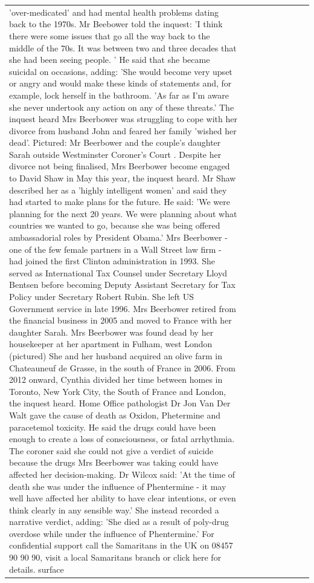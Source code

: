 \begin{table}[H]
\begin{tabular}{lllrlllll}
'over-medicated' and had mental health problems dating back to the 1970s. Mr Beebower told the inquest: 'I think there were some issues that go all the way back to the middle of the 70s. It was between two and three decades that she had been seeing people. ' He said that she became suicidal on occasions, adding: 'She would become very upset or angry and would make these kinds of statements and, for example, lock herself in the bathroom. 'As far as I'm aware she never undertook any action on any of these threats.' The inquest heard Mrs Beerbower was struggling to cope with her divorce from husband John and feared her family 'wished her dead'. Pictured: Mr Beerbower and the couple's daughter Sarah outside Westminster Coroner's Court . Despite her divorce not being finalised, Mrs Beerbower become engaged to David Shaw in May this year, the inquest heard. Mr Shaw described her as a 'highly intelligent women' and said they had started to make plans for the future. He said: 'We were planning for the next 20 years. We were planning about what countries we wanted to go, because she was being offered ambassadorial roles by President Obama.' Mrs Beerbower - one of the few female partners in a Wall Street law firm - had joined the first Clinton administration in 1993. She served as International Tax Counsel under Secretary Lloyd Bentsen before becoming Deputy Assistant Secretary for Tax Policy under Secretary Robert Rubin. She left US Government service in late 1996. Mrs Beerbower retired from the financial business in 2005 and moved to France with her daughter Sarah. Mrs Beerbower was found dead by her housekeeper at her apartment in Fulham, west London (pictured) She and her husband acquired an olive farm in Chateauneuf de Grasse, in the south of France in 2006. From 2012 onward, Cynthia divided her time between homes in Toronto, New York City, the South of France and London, the inquest heard. Home Office pathologist Dr Jon Van Der Walt gave the cause of death as Oxidon, Phetermine and paracetemol toxicity. He said the drugs could have been enough to create a loss of consciousness, or fatal arrhythmia. The coroner said she could not give a verdict of suicide because the drugs Mrs Beerbower was taking could have affected her decision-making. Dr Wilcox said: 'At the time of death she was under the influence of Phentermine - it may well have affected her ability to have clear intentions, or even think clearly in any sensible way.' She instead recorded a narrative verdict, adding: 'She died as a result of poly-drug overdose while under the influence of Phentermine.' For confidential support call the Samaritans in the UK on 08457 90 90 90, visit a local Samaritans branch or click here for details. surface \\

\end{tabular}
\end{table}
